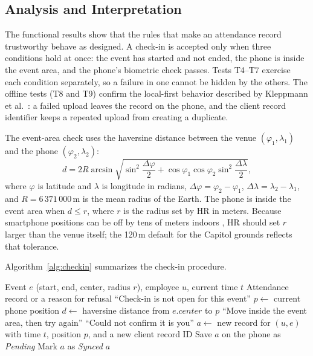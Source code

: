 \documentclass[conference]{IEEEtran}
\begin{document}
\subsection{Analysis and Interpretation}

The functional results show that the rules that make an attendance
record trustworthy behave as designed. A check-in is accepted only when
three conditions hold at once: the event has started and not ended, the
phone is inside the event area, and the phone's biometric check passes.
Tests T4--T7 exercise each condition separately, so a failure in one
cannot be hidden by the others. The offline tests (T8 and T9) confirm the
local-first behavior described by Kleppmann et al.\
\cite{kleppmann2019localfirst}: a failed upload leaves the record on the
phone, and the client record identifier keeps a repeated upload from
creating a duplicate.

The event-area check uses the haversine distance
\cite{sinnott1984haversine} between the venue $(\varphi_1,\lambda_1)$ and
the phone $(\varphi_2,\lambda_2)$:
\begin{equation}
d = 2R\arcsin\sqrt{\sin^2\frac{\Delta\varphi}{2}
+ \cos\varphi_1\cos\varphi_2\sin^2\frac{\Delta\lambda}{2}},
\label{eq:haversine}
\end{equation}
where $\varphi$ is latitude and $\lambda$ is longitude in radians,
$\Delta\varphi = \varphi_2-\varphi_1$, $\Delta\lambda =
\lambda_2-\lambda_1$, and $R = 6\,371\,000$\,m is the mean radius of the
Earth. The phone is inside the event area when $d \le r$, where $r$ is
the radius set by HR in meters. Because smartphone positions can be off
by tens of meters indoors \cite{zandbergen2009accuracy}, HR should set
$r$ larger than the venue itself; the 120\,m default for the Capitol
grounds reflects that tolerance.

Algorithm~\ref{alg:checkin} summarizes the check-in procedure.

\begin{algorithm}[!t]
\caption{Event Check-in}
\label{alg:checkin}
\begin{algorithmic}[1]
\Require Event $e$ (start, end, center, radius $r$), employee $u$,
current time $t$
\Ensure Attendance record or a reason for refusal
    \State \Return ``Check-in is not open for this event''
\EndIf
\State $p \gets$ current phone position
\State $d \gets$ haversine distance from $e.\mathit{center}$ to $p$
\If{$d > r$}
    \State \Return ``Move inside the event area, then try again''
\EndIf
{}
    \State \Return ``Could not confirm it is you''
\EndIf
\State $a \gets$ new record for $(u, e)$ with time $t$, position $p$,
and a new client record ID
\State Save $a$ on the phone as \textit{Pending}
    \State Mark $a$ as \textit{Synced}
\EndIf
\State \Return $a$
\end{algorithmic}
\end{algorithm}
\end{document}
